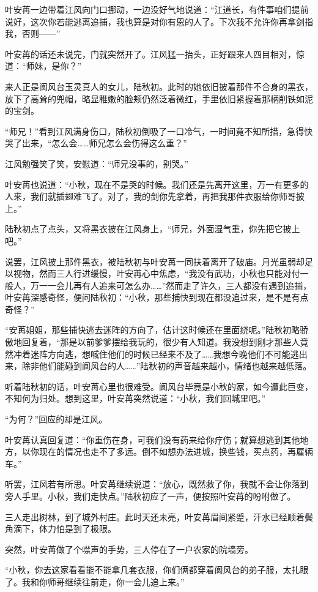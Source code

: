 叶安苒一边带着江风向门口挪动，一边没好气地说道：“江道长，有件事咱们提前说好，这次你若能逃离追捕，我也算是对你有恩的人了。下次我不允许你再拿剑指我，否则——”

叶安苒的话还未说完，门就突然开了。江风猛一抬头，正好跟来人四目相对，惊道：“师妹，是你？”

来人正是阆风台玉灵真人的女儿，陆秋初。此时的她依旧披着那件不合身的黑衣，放下了高耸的兜帽，略显稚嫩的脸颊仍然泛着微红，手里依旧紧握着那柄削铁如泥的宝剑。

“师兄！”看到江风满身伤口，陆秋初倒吸了一口冷气，一时间竟不知所措，急得快哭了出来，“怎么会……师兄怎么会伤得这么重？”

江风勉强笑了笑，安慰道：“师兄没事的，别哭。”

叶安苒也说道：“小秋，现在不是哭的时候。我们还是先离开这里，万一有更多的人来，我们就插翅难飞了。对了，我的剑你先拿着，再把我那件衣服给你师哥披上。”

陆秋初点了点头，又将黑衣披在江风身上，“师兄，外面湿气重，你先把它披上吧。”

说罢，江风披上那件黑衣，被陆秋初与叶安苒一同扶着离开了破庙。月光虽弱却足以视物，然而三人行进缓慢，叶安苒心中焦虑，“我没有武功，小秋也只能对付一般人，万一一会儿再有人追来可怎么办……”然而走了许久，三人都没有遇到追捕，叶安苒深感奇怪，便问陆秋初：“小秋，那些捕快到现在都没追过来，是不是有点奇怪？”

“安苒姐姐，那些捕快逃去迷阵的方向了，估计这时候还在里面绕呢。”陆秋初略骄傲地回复着，“那是以前爹爹摆给我玩的，很少有人知道。我没想到刚才那些人竟然冲着迷阵方向逃，想喊住他们的时候已经来不及了……我想今晚他们不可能逃出来，除非他们能碰到阆风台的人……”陆秋初的声音越来越小，情绪也越来越低落。

听着陆秋初的话，叶安苒心里也很难受。阆风台毕竟是小秋的家，如今遭此巨变，不知何为归处。想到这里，叶安苒突然说道：“小秋，我们回城里吧。”

“为何？”回应的却是江风。

叶安苒认真回复道：“你重伤在身，可我们没有药来给你疗伤；就算想逃到其他地方，以你现在的情况也走不了多远。倒不如想办法进城，换些钱，买点药，再雇辆车。”

听罢，江风若有所思。叶安苒继续说道：“放心，既然救了你，我就不会让你落到旁人手里。小秋，我们走快点。”陆秋初应了一声，便按照叶安苒的吩咐做了。

三人走出树林，到了城外村庄。此时天还未亮，叶安苒眉间紧蹙，汗水已经顺着鬓角滴下，体力怕是到了极限。

突然，叶安苒做了个噤声的手势，三人停在了一户农家的院墙旁。

“小秋，你去这家看看能不能拿几套衣服，你们俩都穿着阆风台的弟子服，太扎眼了。我和你师哥继续往前走，你一会儿追上来。”

